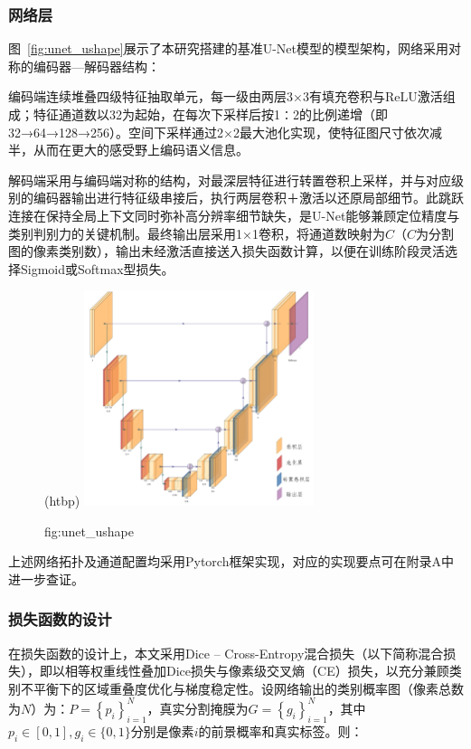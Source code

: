 \subsubsection{网络层}

图~\ref{fig:unet_ushape}展示了本研究搭建的基准U-Net模型的模型架构，网络采用对称的编码器—解码器结构：

编码端连续堆叠四级特征抽取单元，每一级由两层3×3有填充卷积与ReLU激活组成；特征通道数以32为起始，在每次下采样后按1∶2的比例递增（即32→64→128→256）。空间下采样通过2×2最大池化实现，使特征图尺寸依次减半，从而在更大的感受野上编码语义信息。

解码端采用与编码端对称的结构，对最深层特征进行转置卷积上采样，并与对应级别的编码器输出进行特征级串接后，执行两层卷积＋激活以还原局部细节。此跳跃连接在保持全局上下文同时弥补高分辨率细节缺失，是U-Net能够兼顾定位精度与类别判别力的关键机制。最终输出层采用1×1卷积，将通道数映射为$C$（$C$为分割图的像素类别数），输出未经激活直接送入损失函数计算，以便在训练阶段灵活选择Sigmoid或Softmax型损失。

\begin{figure}(htbp)
    \centering
    \includegraphics[width=0.6\textwidth]{fig/Unet_ushape.png}
    \caption{fig:unet_ushape}
    \label{基准U-Net模型的模型架构}
\end{figure}

上述网络拓扑及通道配置均采用Pytorch框架实现，对应的实现要点可在附录A中进一步查证。

\subsubsection{损失函数的设计}

在损失函数的设计上，本文采用Dice – Cross-Entropy混合损失（以下简称混合损失），即以相等权重线性叠加Dice损失与像素级交叉熵（CE）损失，以充分兼顾类别不平衡下的区域重叠度优化与梯度稳定性。设网络输出的类别概率图（像素总数为$N$）为：$ P=\left\{p_{i}\right\}_{i=1}^{N} $，真实分割掩膜为$ G=\left\{g_{i}\right\}_{i=1}^{N} $，其中$ p_{i} \in[0,1], g_{i} \in\{0,1\}$分别是像素$i$的前景概率和真实标签。则：

